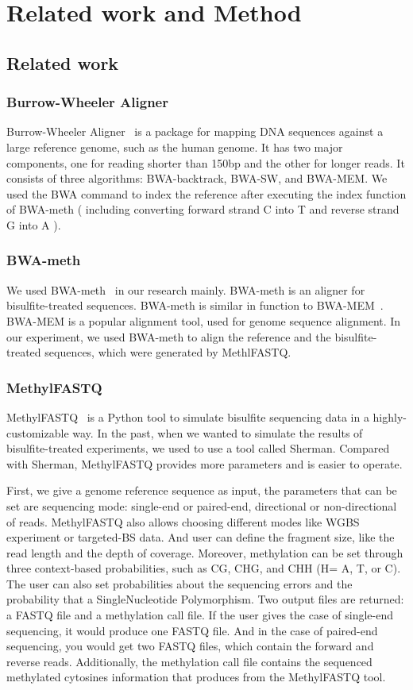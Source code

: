 \documentclass{PHlab-thesis}
\begin{document}
\chapter{Related work and Method}
\section{Related work}
\subsection{Burrow-Wheeler Aligner}
Burrow-Wheeler Aligner~\cite{abuin2015bigbwa} is a package for mapping DNA sequences against a large reference genome, such as the human genome. It has two major components, one for reading shorter than 150bp and the other for longer reads. It consists of three algorithms: BWA-backtrack, BWA-SW, and BWA-MEM. We used the BWA command to index the reference after executing the index function of BWA-meth ( including converting forward strand C into T and reverse strand G into A ).
\subsection{BWA-meth}
We used BWA-meth~\cite{pedersen2014fast} in our research mainly. BWA-meth is an aligner for bisulfite-treated sequences. BWA-meth is similar in function to BWA-MEM~\cite{li2013aligning}. BWA-MEM is a popular alignment tool, used for genome sequence alignment. In our experiment, we used BWA-meth to align the reference and the bisulfite-treated sequences, which were generated by MethlFASTQ.
\subsection{MethylFASTQ}
MethylFASTQ~\cite{piaggeschi2019methylfastq} is a Python tool to simulate bisulfite sequencing data in a highly-customizable way. In the past, when we wanted to simulate the results of bisulfite-treated experiments, we used to use a tool called Sherman. Compared with Sherman, MethylFASTQ provides more parameters and is easier to operate.
\par First, we give a genome reference sequence as input, the parameters that can be set are sequencing mode: single-end or paired-end, directional or non-directional of reads. MethylFASTQ also allows choosing different modes like WGBS experiment or targeted-BS data. And user can define the fragment size, like the read length and the depth of coverage. Moreover, methylation can be set through three context-based probabilities, such as CG, CHG, and CHH (H= A, T, or C). The user can also set probabilities about the sequencing errors and the probability that a SingleNucleotide Polymorphism. Two output files are returned: a FASTQ file and a methylation call file. If the user gives the case of single-end sequencing, it would produce one FASTQ file. And in the case of paired-end sequencing, you would get two FASTQ files, which contain the forward and reverse reads. Additionally, the methylation call file contains the sequenced methylated cytosines information that produces from the MethylFASTQ tool. 
\end{document}
